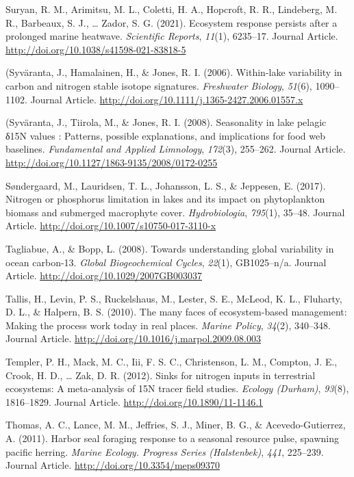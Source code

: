 \documentclass [11pt, proquest] {uwthesis}[2015/03/03]
\begin{document}
\hypertarget{ref-Suryan2021}{}
Suryan, R. M., Arimitsu, M. L., Coletti, H. A., Hopcroft, R. R.,
Lindeberg, M. R., Barbeaux, S. J., \ldots{} Zador, S. G. (2021).
Ecosystem response persists after a prolonged marine heatwave.
\emph{Scientific Reports}, \emph{11}(1), 6235--17. Journal Article.
\url{http://doi.org/10.1038/s41598-021-83818-5}

\hypertarget{ref-Syvaranta2006}{}
(Syväranta, J., Hamalainen, H., \& Jones, R. I. (2006). Within-lake
variability in carbon and nitrogen stable isotope signatures.
\emph{Freshwater Biology}, \emph{51}(6), 1090--1102. Journal Article.
\url{http://doi.org/10.1111/j.1365-2427.2006.01557.x}

\hypertarget{ref-Syvaranta2008}{}
(Syväranta, J., Tiirola, M., \& Jones, R. I. (2008). Seasonality in lake
pelagic δ15N values : Patterns, possible explanations, and implications
for food web baselines. \emph{Fundamental and Applied Limnology},
\emph{172}(3), 255--262. Journal Article.
\url{http://doi.org/10.1127/1863-9135/2008/0172-0255}

\hypertarget{ref-Sondergaard2017}{}
Søndergaard, M., Lauridsen, T. L., Johansson, L. S., \& Jeppesen, E.
(2017). Nitrogen or phosphorus limitation in lakes and its impact on
phytoplankton biomass and submerged macrophyte cover.
\emph{Hydrobiologia}, \emph{795}(1), 35--48. Journal Article.
\url{http://doi.org/10.1007/s10750-017-3110-x}

\hypertarget{ref-Tagliabue2008}{}
Tagliabue, A., \& Bopp, L. (2008). Towards understanding global
variability in ocean carbon-13. \emph{Global Biogeochemical Cycles},
\emph{22}(1), GB1025--n/a. Journal Article.
\url{http://doi.org/10.1029/2007GB003037}

\hypertarget{ref-Tallis2010}{}
Tallis, H., Levin, P. S., Ruckelshaus, M., Lester, S. E., McLeod, K. L.,
Fluharty, D. L., \& Halpern, B. S. (2010). The many faces of
ecosystem-based management: Making the process work today in real
places. \emph{Marine Policy}, \emph{34}(2), 340--348. Journal Article.
\url{http://doi.org/10.1016/j.marpol.2009.08.003}

\hypertarget{ref-Templer2012}{}
Templer, P. H., Mack, M. C., Iii, F. S. C., Christenson, L. M., Compton,
J. E., Crook, H. D., \ldots{} Zak, D. R. (2012). Sinks for nitrogen
inputs in terrestrial ecosystems: A meta-analysis of 15N tracer field
studies. \emph{Ecology (Durham)}, \emph{93}(8), 1816--1829. Journal
Article. \url{http://doi.org/10.1890/11-1146.1}

\hypertarget{ref-Thomas2011}{}
Thomas, A. C., Lance, M. M., Jeffries, S. J., Miner, B. G., \&
Acevedo-Gutierrez, A. (2011). Harbor seal foraging response to a
seasonal resource pulse, spawning pacific herring. \emph{Marine Ecology.
Progress Series (Halstenbek)}, \emph{441}, 225--239. Journal Article.
\url{http://doi.org/10.3354/meps09370}
\end{document}
